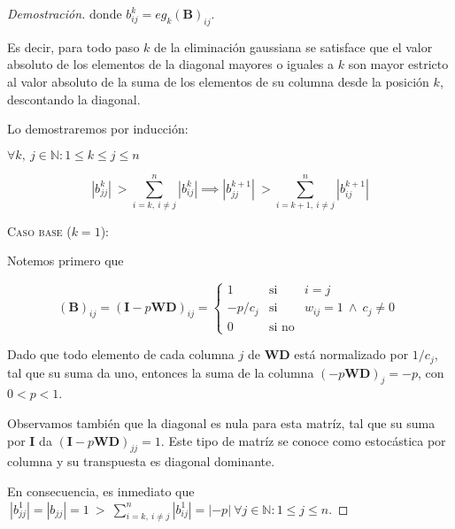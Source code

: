 \begin{proof}[Demostración]
\vspace{0.5em}
\noindent donde $b^k_{ij} = eg_k(\mathbf{B})_{ij}$.

\vspace{1em}
Es decir, para todo paso $k$ de la eliminación gaussiana se satisface que el valor absoluto de los elementos de la diagonal mayores o iguales a $k$ son mayor estricto al valor absoluto de la suma de los elementos de su columna desde la posición $k$, descontando la diagonal.

\vspace{1em}
\noindent Lo demostraremos por inducción:

\vspace{2em}
\noindent $\forall k,\ j \in \mathbb{N}: 1 \leq k \leq j \leq n$ 

\begin{equation*}
    |b^{k}_{jj}| \ > \sum_{i = k,\ i \neq j}^{n} |b^{k}_{ij}| \implies |b^{k+1}_{jj}| \ > \sum_{i = k+1,\ i \neq j}^{n} |b^{k+1}_{ij}|
\end{equation*}

\newpage
\noindent \textsc{Caso base} ($k = 1$):

\vspace{1em}
\noindent Notemos primero que 

\begin{equation*}
    (\mathbf{B})_{ij} = (\mathbf{I} - p\mathbf{W}\mathbf{D})_{ij} =
    \left\{ 
        \begin{array}{lcc}
            1           & \text{si} & i = j   \\
            -p / c_j    & \text{si} & w_{ij} = 1\ \wedge\ c_j \neq 0 \\
            0           & \text{si no}   
        \end{array}
    \right.\ 
\end{equation*}

\vspace{2em}
Dado que todo elemento de cada columna $j$ de $\mathbf{W}\mathbf{D}$ está normalizado por $1/c_j$, tal que su suma da uno, entonces la suma de la columna $(-p\mathbf{W}\mathbf{D})_{j} = -p$, con $0 < p < 1$.

\vspace{1em}
Observamos también que la diagonal es nula para esta matríz, tal que su suma por $\mathbf{I}$ da $(\mathbf{I} - p\mathbf{W}\mathbf{D})_{jj} = 1$. Este tipo de matríz se conoce como estocástica por columna y su transpuesta es diagonal dominante. 

\vspace{1em}
\noindent En consecuencia, es inmediato que $\ |b^{1}_{jj}| = |b_{jj}| = 1\ >\ \sum_{i = k,\ i \neq j}^{n} |b^{1}_{ij}| = |-p|\ \forall j \in \mathbb{N}: 1 \leq j \leq n$. 


\end{proof}
